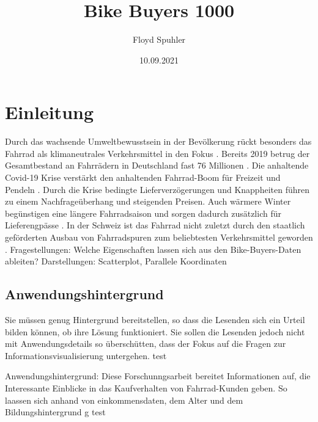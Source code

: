 \documentclass[usegeometry=true]{scrartcl}
\begin{document}
\subject{Projektbericht zum Modul Information Retrieval und Visualisierung Sommersemester 2021}
\title{Bike Buyers 1000}
\author{Floyd Spuhler}%
\date{10.09.2021}
\maketitle%

\section{Einleitung}
Durch das wachsende Umweltbewusstsein in der Bevölkerung rückt besonders das Fahrrad als klimaneutrales Verkehrsmittel in den Fokus \cite{Marquart.2021}. Bereits 2019 betrug der Gesamtbestand an Fahrrädern in Deutschland fast 76 Millionen \cite{Kords.26.06.2020,Statista.25.08.2021}. Die anhaltende Covid-19 Krise verstärkt den anhaltenden Fahrrad-Boom für Freizeit und  Pendeln \cite{Platter.2020}. Durch die Krise bedingte Lieferverzögerungen und Knappheiten führen zu einem Nachfrageüberhang und steigenden Preisen. Auch wärmere Winter begünstigen eine längere Fahrradsaison und sorgen dadurch zusätzlich für Lieferengpässe \cite{tagesschau.11.03.2021}. 
In der Schweiz ist das Fahrrad nicht zuletzt durch den staatlich geförderten Ausbau von Fahrradspuren zum beliebtesten Verkehrsmittel geworden \cite{Platter.2020}.
\newline Fragestellungen: Welche Eigenschaften lassen sich aus den Bike-Buyers-Daten ableiten? Darstellungen: Scatterplot, Parallele Koordinaten

\subsection{Anwendungshintergrund}
Sie müssen genug Hintergrund bereitstellen, so dass die Lesenden sich ein Urteil bilden können, ob ihre Lösung funktioniert. Sie sollen die Lesenden jedoch nicht mit Anwendungsdetails so überschütten, dass der Fokus auf die Fragen zur Informationsvisualisierung untergehen. \cite{Platter.2020} test

Anwendungshintergrund: Diese Forschunngsarbeit bereitet Informationen auf, die Interessante Einblicke in das Kaufverhalten von Fahrrad-Kunden geben. So laassen sich anhand von einkommensdaten, dem Alter und dem Bildungshintergrund \cite{Munzner.2008} g 
\cite{Platter.2020}
\newline test
\end{document}
